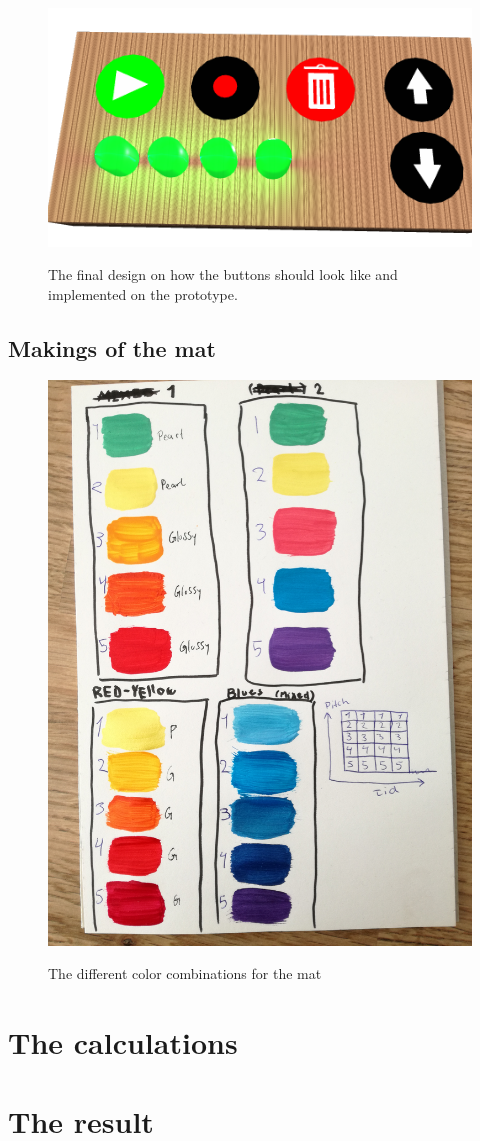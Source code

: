 \begin{figure}[H]
	\centering
	\includegraphics[width=0.7\linewidth]{figure/Design/buttonDesign}
	\label{fig:buttonDesign}
	\caption{The final design on how the buttons should look like and implemented on the prototype.}
	
\end{figure}


\subsection{Makings of the mat}

\begin{figure}[H]
	\centering
	\includegraphics[width=0.5\linewidth]{figure/Design/colors}
	\label{fig:colors}
	\caption{The different color combinations for the mat}
	
\end{figure}

\section{The calculations}

\section{The result}













